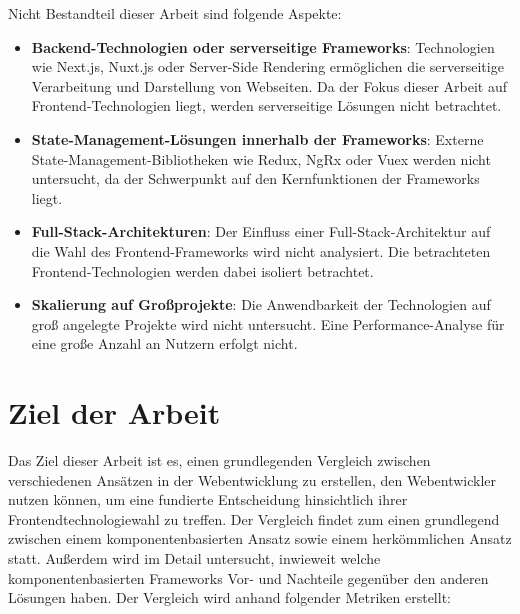 \documentclass[oneside]{ausarbeitung}
\begin{document}
Nicht Bestandteil dieser Arbeit sind folgende Aspekte: 
\begin{itemize}
    \item \textbf{Backend-Technologien oder serverseitige Frameworks}:  
          Technologien wie Next.js, Nuxt.js oder Server-Side Rendering ermöglichen die serverseitige Verarbeitung und Darstellung von Webseiten.  
          Da der Fokus dieser Arbeit auf Frontend-Technologien liegt, werden serverseitige Lösungen nicht betrachtet.
    \item \textbf{State-Management-Lösungen innerhalb der Frameworks}:  
          Externe State-Management-Bibliotheken wie Redux, NgRx oder Vuex werden nicht untersucht, da 		der Schwerpunkt auf den Kernfunktionen der Frameworks liegt.
    \item \textbf{Full-Stack-Architekturen}:  
          Der Einfluss einer Full-Stack-Architektur auf die Wahl des Frontend-Frameworks wird nicht analysiert. Die betrachteten Frontend-Technologien werden dabei isoliert betrachtet.
    \item \textbf{Skalierung auf Großprojekte}:  
          Die Anwendbarkeit der Technologien auf groß angelegte Projekte wird nicht untersucht.  
          Eine Performance-Analyse für eine große Anzahl an Nutzern erfolgt nicht.
\end{itemize}



\section{Ziel der Arbeit}
\label{sec:ziel}

Das Ziel dieser Arbeit ist es, einen grundlegenden Vergleich zwischen verschiedenen Ansätzen in der Webentwicklung zu erstellen, den Webentwickler nutzen können, um eine fundierte Entscheidung hinsichtlich ihrer Frontendtechnologiewahl zu treffen. Der Vergleich findet zum einen grundlegend zwischen einem komponentenbasierten Ansatz sowie einem herkömmlichen Ansatz statt. Außerdem wird im Detail untersucht, inwieweit welche komponentenbasierten Frameworks Vor- und Nachteile gegenüber den anderen Lösungen haben. Der Vergleich wird anhand folgender Metriken erstellt:  
\end{document}
